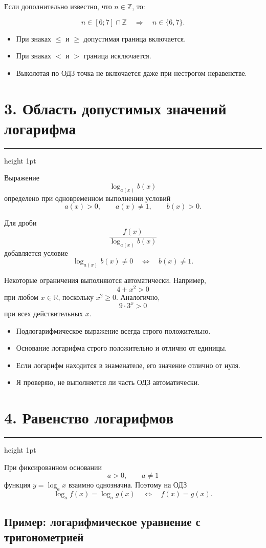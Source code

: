 \documentclass[a4paper,12pt]{article}
\newcommand{\checkitem}{\item[$\square$]}
\newcommand{\R}{\mathbb{R}}
\newcommand{\Z}{\mathbb{Z}}
\newcommand{\sectionrule}{%
  \vspace{-2mm}
  {\color{lightaccent}\hrule height 1pt}
  \vspace{3mm}
}
\begin{document}
Если дополнительно известно, что \(n\in\Z\), то:

\[
n\in[6;7]\cap\Z
\quad\Longrightarrow\quad
n\in\{6,7\}.
\]

\begin{itemize}
  \checkitem При знаках \(\le\) и \(\ge\) допустимая граница включается.
  \checkitem При знаках \(<\) и \(>\) граница исключается.
  \checkitem Выколотая по ОДЗ точка не включается даже при нестрогом неравенстве.
\end{itemize}


\section*{\textcolor{darkaccent}{3. Область допустимых значений логарифма}}
\sectionrule

Выражение
\[
\log_{a(x)} b(x)
\]
определено при одновременном выполнении условий
\[
\boxed{
a(x)>0,\qquad
a(x)\ne1,\qquad
b(x)>0.
}
\]

Для дроби
\[
\frac{f(x)}{\log_{a(x)}b(x)}
\]
добавляется условие
\[
\log_{a(x)}b(x)\ne0
\quad\Longleftrightarrow\quad
b(x)\ne1.
\]

Некоторые ограничения выполняются автоматически. Например,
\[
4+x^2>0
\]
при любом \(x\in\R\), поскольку \(x^2\ge0\). Аналогично,
\[
9\cdot3^x>0
\]
при всех действительных \(x\).

\begin{itemize}
  \checkitem Подлогарифмическое выражение всегда строго положительно.
  \checkitem Основание логарифма строго положительно и отлично от единицы.
  \checkitem Если логарифм находится в знаменателе, его значение отлично от нуля.
  \checkitem Я проверяю, не выполняется ли часть ОДЗ автоматически.
\end{itemize}


\section*{\textcolor{darkaccent}{4. Равенство логарифмов}}
\sectionrule

При фиксированном основании
\[
a>0,\qquad a\ne1
\]
функция \(y=\log_a x\) взаимно однозначна. Поэтому на ОДЗ
\[
\log_a f(x)=\log_a g(x)
\quad\Longleftrightarrow\quad
f(x)=g(x).
\]

\subsection*{\textcolor{accent}{Пример: логарифмическое уравнение с тригонометрией}}
\end{document}
